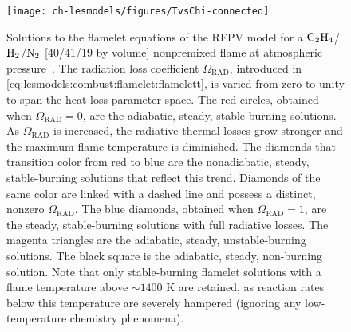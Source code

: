 \begin{figure}[htb]
  \begin{center}
    \texttt{[image: ch-lesmodels/figures/TvsChi-connected]}
    \caption[Flamelet Solutions of RFPV Model, $T|Z_{st}$ vs. $\chi|Z_{st}$]{Solutions to the flamelet equations of the RFPV model for a $\ce{C2H4}$/$\ce{H2}$/$\ce{N2}$ [40/41/19 by volume] nonpremixed flame at atmospheric pressure~\cite{mahmoud2017}. The radiation loss coefficient $\Omega_{\text{RAD}}$, introduced in \cref{eq:lesmodels:combust:flamelet:flamelett}, is varied from zero to unity to span the heat loss parameter space. The red circles, obtained when $\Omega_{\text{RAD}} = 0$, are the adiabatic, steady, stable-burning solutions. As $\Omega_{\text{RAD}}$ is increased, the radiative thermal losses grow stronger and the maximum flame temperature is diminished. The diamonds that transition color from red to blue are the nonadiabatic, steady, stable-burning solutions that reflect this trend. Diamonds of the same color are linked with a dashed line and possess a distinct, nonzero $\Omega_{\text{RAD}}$. The blue diamonds, obtained when $\Omega_{\text{RAD}} = 1$, are the steady, stable-burning solutions with full radiative losses. The magenta triangles are the adiabatic, steady, unstable-burning solutions. The black square is the adiabatic, steady, non-burning solution. Note that only stable-burning flamelet solutions with a flame temperature above $\sim 1400$ K are retained, as reaction rates below this temperature are severely hampered (ignoring any low-temperature chemistry phenomena).}
    \label{fig:lesmodels:combust:flamelet:tvschi}
  \end{center}
\end{figure}
